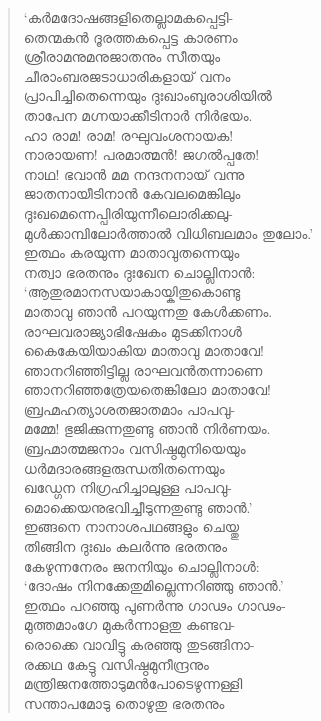 \begin{verse}
‘കര്‍മദോഷങ്ങളിതെല്ലാമകപ്പെട്ടി-\\
തെന്മകന്‍ ദൂരത്തകപ്പെട്ട കാരണം\\
ശ്രീരാമനുമനുജാതനും സീതയും\\
ചീരാംബരജടാധാരികളായ് വനം\\
പ്രാപിച്ചിതെന്നെയും ദുഃഖാംബുരാശിയില്‍\\
താപേന മഗ്നയാക്കീടിനാര്‍ നിര്‍ഭയം.\\
ഹാ രാമ! രാമ! രഘുവംശനായക!\\
നാരായണ! പരമാത്മന്‍! ജഗല്‍പ്പതേ!\\
നാഥ! ഭവാന്‍ മമ നന്ദനനായ് വന്നു\\
ജാതനായീടിനാന്‍ കേവലമെങ്കിലും\\
ദുഃഖമെന്നെപ്പിരിയുന്നീലൊരിക്കലു-\\
മുള്‍ക്കാമ്പിലോര്‍ത്താല്‍ വിധിബലമാം തുലോം.’\\
ഇത്ഥം കരയുന്ന മാതാവുതന്നെയും\\
നത്വാ ഭരതനും ദുഃഖേന ചൊല്ലിനാന്‍:\\
‘ആതുരമാനസയാകായ്കിതുകൊണ്ടു\\
മാതാവു ഞാന്‍ പറയുന്നതു കേള്‍ക്കണം.\\
രാഘവരാജ്യാഭിഷേകം മുടക്കിനാള്‍\\
കൈകേയിയാകിയ മാതാവു മാതാവേ!\\
ഞാനറിഞ്ഞിട്ടില്ല രാഘവന്‍തന്നാണെ\\
ഞാനറിഞ്ഞത്രേയതെങ്കിലോ മാതാവേ!\\
ബ്രഹ്മഹത്യാശതജാതമാം പാപവു-\\
മമ്മേ! ഭുജിക്കുന്നതുണ്ടു ഞാന്‍ നിര്‍ണയം.\\
ബ്രഹ്മാത്മജനാം വസിഷ്ഠമുനിയെയും\\
ധര്‍മദാരങ്ങളരുന്ധതിതന്നെയും\\
ഖഡ്ഗേന നിഗ്രഹിച്ചാലുള്ള പാപവു-\\
മൊക്കെയനുഭവിച്ചീടുന്നതുണ്ടു ഞാന്‍.’\\
ഇങ്ങനെ നാനാശപഥങ്ങളും ചെയ്തു\\
തിങ്ങിന ദുഃഖം കലര്‍ന്നു ഭരതനും\\
കേഴുന്നനേരം ജനനിയും ചൊല്ലിനാള്‍:\\
‘ദോഷം നിനക്കേതുമില്ലെന്നറിഞ്ഞു ഞാന്‍.’\\
ഇത്ഥം പറഞ്ഞു പുണര്‍ന്നു ഗാഢം ഗാഢം-\\
മുത്തമാംഗേ മുകര്‍ന്നാളതു കണ്ടവ-\\
രൊക്കെ വാവിട്ടു കരഞ്ഞു തുടങ്ങിനാ-\\
രക്കഥ കേട്ടു വസിഷ്ഠമുനീന്ദ്രനും\\
മന്ത്രിജനത്തോടുമന്‍പോടെഴുന്നള്ളി\\
സന്താപമോടു തൊഴുതു ഭരതനും\\

\end{verse}
